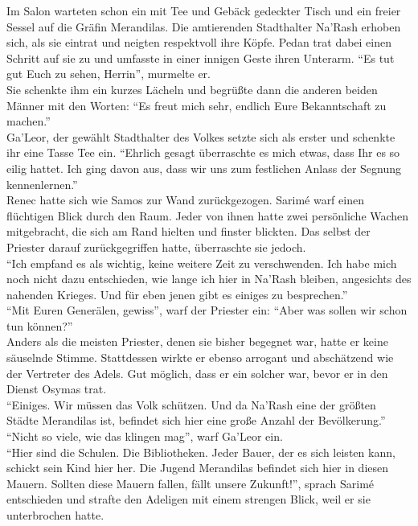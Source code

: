 Im Salon warteten schon ein mit Tee und Gebäck gedeckter Tisch und ein freier Sessel auf die Gräfin 
Merandilas. Die amtierenden Stadthalter Na'Rash erhoben sich, als sie eintrat und neigten 
respektvoll ihre Köpfe. Pedan trat dabei einen Schritt auf sie zu und umfasste in einer innigen 
Geste ihren Unterarm. ``Es tut gut Euch zu sehen, Herrin'', murmelte er.\\
Sie schenkte ihm ein kurzes Lächeln und begrüßte dann die anderen beiden Männer mit den Worten: 
``Es freut mich sehr, endlich Eure Bekanntschaft zu machen.''\\
Ga'Leor, der gewählt Stadthalter des Volkes setzte sich als erster und schenkte ihr eine Tasse Tee 
ein. ``Ehrlich gesagt überraschte es mich etwas, dass Ihr es so eilig hattet. Ich ging davon aus, 
dass wir uns zum festlichen Anlass der Segnung kennenlernen.''\\
Renec hatte sich wie Samos zur Wand zurückgezogen. Sarimé warf einen flüchtigen Blick durch den 
Raum. Jeder von ihnen hatte zwei persönliche Wachen mitgebracht, die sich am Rand hielten und 
finster blickten. Das selbst der Priester darauf zurückgegriffen hatte, überraschte sie jedoch.\\
``Ich empfand es als wichtig, keine weitere Zeit zu verschwenden. Ich habe mich noch nicht dazu 
entschieden, wie lange ich hier in Na'Rash bleiben, angesichts des nahenden Krieges. Und für eben 
jenen gibt es einiges zu besprechen.''\\
``Mit Euren Generälen, gewiss'', warf der Priester ein: ``Aber was sollen wir schon tun können?''\\
Anders als die meisten Priester, denen sie bisher begegnet war, hatte er keine säuselnde Stimme. 
Stattdessen wirkte er ebenso arrogant und abschätzend wie der Vertreter des Adels. Gut möglich, 
dass er ein solcher war, bevor er in den Dienst Osymas trat.\\
``Einiges. Wir müssen das Volk schützen. Und da Na'Rash eine der größten Städte Merandilas ist, 
befindet sich hier eine große Anzahl der Bevölkerung.''\\
``Nicht so viele, wie das klingen mag'', warf Ga'Leor ein.\\
``Hier sind die Schulen. Die Bibliotheken. Jeder Bauer, der es sich leisten kann, schickt sein Kind 
hier her. Die Jugend Merandilas befindet sich hier in diesen Mauern. Sollten diese Mauern fallen, 
fällt unsere Zukunft!'', sprach Sarimé entschieden und strafte den Adeligen mit einem strengen 
Blick, weil er sie unterbrochen hatte.\\
